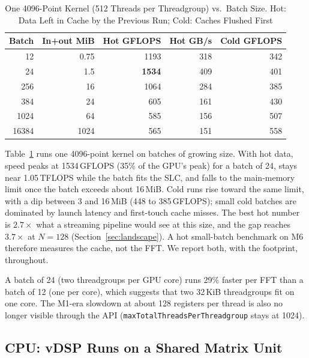 \documentclass[conference]{IEEEtran}
\newcommand{\GF}{\,GFLOPS}
\begin{document}
\begin{table}[t]
\centering
\caption{One 4096-Point Kernel (512 Threads per Threadgroup) vs.\ Batch Size. Hot: Data Left in
Cache by the Previous Run; Cold: Caches Flushed First}
\label{tab:batch}
\footnotesize
\begin{tabular}{@{}rrrrr@{}}
\toprule
\textbf{Batch} & \textbf{In+out MiB} & \textbf{Hot GFLOPS} & \textbf{Hot GB/s} & \textbf{Cold GFLOPS} \\
\midrule
12 & 0.75 & 1193 & 318 & 342 \\
24 & 1.5 & \textbf{1534} & 409 & 401 \\
256 & 16 & 1064 & 284 & 385 \\
384 & 24 & 605 & 161 & 430 \\
1024 & 64 & 585 & 156 & 507 \\
16384 & 1024 & 565 & 151 & 558 \\
\bottomrule
\end{tabular}
\end{table}

Table~\ref{tab:batch} runs one 4096-point kernel on batches of growing size. With hot data, speed peaks
at 1534\GF{} (35\% of the GPU's peak) for a batch of 24, stays near 1.05\,TFLOPS while the batch fits
the SLC, and falls to the main-memory limit once the batch exceeds about 16\,MiB. Cold runs rise toward
the same limit, with a dip between 3 and 16\,MiB (448 to 385\GF{}); small cold batches are dominated by
launch latency and first-touch cache misses. The best hot number is $2.7\times$ what a streaming
pipeline would see at this size, and the gap reaches $3.7\times$ at $N=128$ (Section~\ref{sec:landscape}).
A hot small-batch benchmark on M6 therefore measures the cache, not the FFT. We report both, with the
footprint, throughout.

A batch of 24 (two threadgroups per GPU core) runs 29\% faster per FFT than a batch of 12 (one per
core), which suggests that two 32\,KiB threadgroups fit on one core. The M1-era slowdown at about 128
registers per thread is also no longer visible through the API
(\texttt{maxTotalThreadsPerThreadgroup} stays at 1024).

\subsection{CPU: vDSP Runs on a Shared Matrix Unit}\label{sec:cpu}
\end{document}
